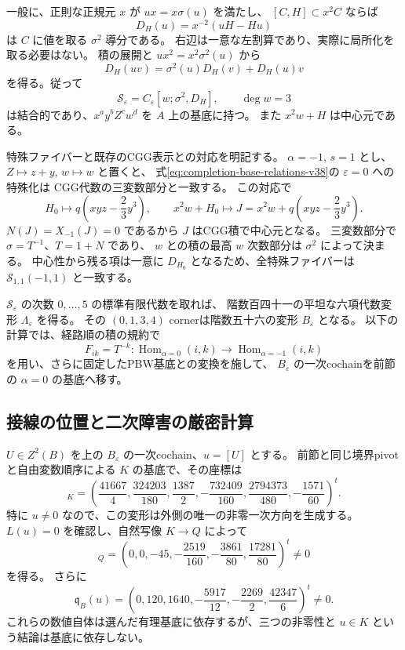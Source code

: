 一般に、正則な正規元 $x$ が $ux=x\sigma(u)$ を満たし、
$[C,H]\subset x^2C$ ならば
\[
 D_H(u)=x^{-2}(uH-Hu)
\]
は $C$ に値を取る $\sigma^2$ 導分である。
右辺は一意な左割算であり、実際に局所化を取る必要はない。
積の展開と $ux^2=x^2\sigma^2(u)$ から
\[
 D_H(uv)=\sigma^2(u)D_H(v)+D_H(u)v
\]
を得る。従って
\begin{equation}
 \mathcal S_\varepsilon
   =C_\varepsilon[w;\sigma^2,D_H],\qquad \deg w=3
 \label{eq:completion-Ore-v38}
\end{equation}
は結合的であり、$x^a y^bZ^cw^d$ を $A$ 上の基底に持つ。
また $x^2w+H$ は中心元である。

特殊ファイバーと既存のCGG表示との対応を明記する。
$\alpha=-1$, $s=1$ とし、$Z\mapsto z+y$, $w\mapsto w$ と置くと、
式\eqref{eq:completion-base-relations-v38}の $\varepsilon=0$ への特殊化は
CGG代数の三変数部分と一致する。
この対応で
\[
 H_0\longmapsto q\left(xyz-\frac23y^3\right),\qquad
 x^2w+H_0\longmapsto
 J=x^2w+q\left(xyz-\frac23y^3\right).
\]
$N(J)=X_{-1}(J)=0$ であるから $J$ はCGG積で中心元となる。
三変数部分で $\sigma=T^{-1}$、$T=1+N$ であり、
$w$ との積の最高 $w$ 次数部分は $\sigma^2$ によって決まる。
中心性から残る項は一意に $D_{H_0}$ となるため、全特殊ファイバーは
$\mathcal S_{1,1}(-1,1)$ と一致する。

$\mathcal S_\varepsilon$ の次数 $0,\ldots,5$ の標準有限代数を取れば、
階数百四十一の平坦な六項代数変形 $\Lambda_\varepsilon$ を得る。
その $(0,1,3,4)$ cornerは階数五十六の変形 $B_\varepsilon$ となる。
以下の計算では、経路順の積の規約で
\[
 F_{ik}=T^{-k}:\operatorname{Hom}_{\alpha=0}(i,k)
                 \longrightarrow\operatorname{Hom}_{\alpha=-1}(i,k)
\]
を用い、さらに固定したPBW基底との変換を施して、
$B_\varepsilon$ の一次cochainを前節の $\alpha=0$ の基底へ移す。

\subsection{接線の位置と二次障害の厳密計算}

$U\in Z^2(B)$ を上の $B_\varepsilon$ の一次cochain、$u=[U]$ とする。
前節と同じ境界pivotと自由変数順序による $K$ の基底で、その座標は
\begin{equation}
 [u]_K=
 \left(\frac{41667}{4},\frac{324203}{180},\frac{1387}{2},
 -\frac{732409}{160},\frac{2794373}{480},-\frac{1571}{60}\right)^t.
 \label{eq:completion-K-coordinates-v38}
\end{equation}
特に $u\ne0$ なので、この変形は外側の唯一の非零一次方向を生成する。
$L(u)=0$ を確認し、自然写像 $K\to Q$ によって
\begin{equation}
 [u]_Q=
 \left(0,0,-45,-\frac{2519}{160},-\frac{3861}{80},
                  \frac{17281}{80}\right)^t\ne0
 \label{eq:completion-Q-coordinates-v38}
\end{equation}
を得る。
さらに
\begin{equation}
 \mathfrak q_B(u)=
 \left(0,120,1640,-\frac{5917}{12},-\frac{2269}{2},
                     \frac{42347}{6}\right)^t\ne0.
 \label{eq:completion-secondary-value-v38}
\end{equation}
これらの数値自体は選んだ有理基底に依存するが、三つの非零性と
$u\in K$ という結論は基底に依存しない。

